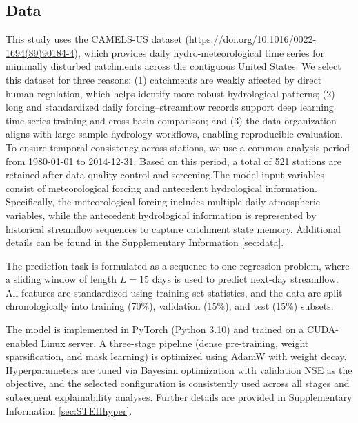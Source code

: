\subsection{Data}
\label{sec:Data}
This study uses the CAMELS-US dataset (\href{https://doi.org/10.1016/0022-1694(89)90184-4}{https://doi.org/10.1016/0022-1694(89)90184-4}), which provides daily hydro-meteorological time series for minimally disturbed catchments across the contiguous United States\cite{CAMELS}. We select this dataset for three reasons: (1) catchments are weakly affected by direct human regulation, which helps identify more robust hydrological patterns; (2) long and standardized daily forcing--streamflow records support deep learning time-series training and cross-basin comparison\cite{hess-camels}; and (3) the data organization aligns with large-sample hydrology workflows, enabling reproducible evaluation\cite{nearing2021role}. To ensure temporal consistency across stations, we use a common analysis period from 1980-01-01 to 2014-12-31. Based on this period, a total of 521 stations are retained after data quality control and screening.The model input variables consist of meteorological forcing and antecedent hydrological information. Specifically, the meteorological forcing includes multiple daily atmospheric variables, while the antecedent hydrological information is represented by historical streamflow sequences to capture catchment state memory. Additional details can be found in the Supplementary Information \ref{sec:data}.

The prediction task is formulated as a sequence-to-one regression problem, where a sliding window of length $L=15$ days is used to predict next-day streamflow. All features are standardized using training-set statistics, and the data are split chronologically into training (70\%), validation (15\%), and test (15\%) subsets.

The model is implemented in PyTorch (Python 3.10) and trained on a CUDA-enabled Linux server. A three-stage pipeline (dense pre-training, weight sparsification, and mask learning) is optimized using AdamW with weight decay. Hyperparameters are tuned via Bayesian optimization\cite{BO_OPT} with validation NSE as the objective, and the selected configuration is consistently used across all stages and subsequent explainability analyses. Further details are provided in Supplementary Information \ref{sec:STEHhyper}.